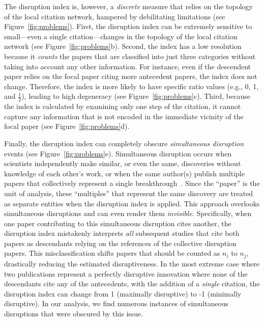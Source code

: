\documentclass[12pt]{article}
\begin{document}
The disruption index is, however, a \emph{discrete} measure that relies on the topology of the local citation network, hampered by debilitating limitations (see Figure~\ref{fig:problems}). First, the disruption index can be extremely sensitive to small---even a single citation---changes in the topology of the local citation network (see Figure~\ref{fig:problems}b). Second, the index has a low resolution because it \emph{counts} the papers that are classified into just three categories without taking into account any other information. For instance, even if the descendent paper relies on the focal paper citing more antecedent papers, the index does not change. Therefore, the index is more likely to have specific ratio values (e.g., 0, 1, and $\frac{1}{2}$), leading to high degeneracy (see Figure~\ref{fig:problems}c).  Third, because the index is calculated by examining only one step of the citation, it cannot capture any information that is not encoded in the immediate vicinity of the focal paper (see Figure~\ref{fig:problems}d). 

Finally, the disruption index can completely obscure \emph{simultaneous disruption} events (see Figure~\ref{fig:problems}e). Simultaneous disruption occurs when scientists independently make similar, or even the same, discoveries without knowledge of each other's work, or when the same author(s) publish multiple papers that collectively represent a single breakthrough~\cite{merton1961singletons, bikard2020idea}.  Since the ``paper'' is the unit of analysis, these ``multiples'' that represent the same discovery are treated as separate entities when the disruption index is applied. This approach overlooks simultaneous disruptions and can even render them \emph{invisible}. Specifically, when one paper contributing to this simultaneous disruption cites another, the disruption index mistakenly interprets \emph{all} subsequent studies that cite both papers as descendants relying on the references of the collective disruption papers. This misclassification shifts papers that should be counted as $n_i$ to $n_j$, drastically reducing the estimated disruptiveness. In the most extreme case where two publications represent a perfectly disruptive innovation where none of the descendants cite any of the antecedents, with the addition of a \emph{single} citation, the disruption index can change from 1 (maximally disruptive) to -1 (minimally disruptive). 
In our analysis, we find numerous instances of simultaneous disruptions that were obscured by this issue.
\end{document}
